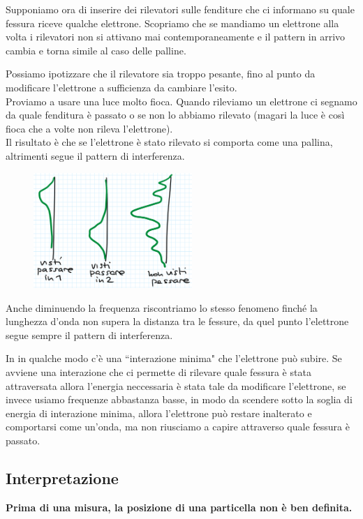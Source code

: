 \bigskip

\noindent
Supponiamo ora di inserire dei rilevatori sulle fenditure che ci informano su quale fessura riceve qualche elettrone.
Scopriamo che se mandiamo un elettrone alla volta i rilevatori non si attivano mai contemporaneamente e il pattern in arrivo cambia e torna simile al caso delle palline.\bigskip


Possiamo ipotizzare che il rilevatore sia troppo pesante, fino al punto da modificare l'elettrone a sufficienza da cambiare l'esito.\\
Proviamo a usare una luce molto fioca. Quando rileviamo un elettrone ci segnamo da quale fenditura \`e passato o se non lo abbiamo rilevato (magari la luce \`e cos\`i fioca che a volte non rileva l'elettrone).\\
Il risultato \`e che se l'elettrone \`e stato rilevato si comporta come una pallina, altrimenti segue il pattern di interferenza.
\begin{figure}[!htb]
    \centering
    \includegraphics[width=6cm]{images/visti_passare_o_non_visti.png}
\end{figure}


Anche diminuendo la frequenza riscontriamo lo stesso fenomeno finch\'e la lunghezza d'onda non supera la distanza tra le fessure, da quel punto l'elettrone segue sempre il pattern di interferenza.\bigskip


In in qualche modo c'\`e una ``interazione minima" che l'elettrone pu\`o subire. Se avviene una interazione che ci permette di rilevare quale fessura \`e stata attraversata allora l'energia neccessaria \`e stata tale da modificare l'elettrone, se invece usiamo frequenze abbastanza basse, in modo da scendere sotto la soglia di energia di interazione minima, allora l'elettrone pu\`o restare inalterato e comportarsi come un'onda, ma non riusciamo a capire attraverso quale fessura \`e passato.

\subsection{Interpretazione}
\begin{fact}
\textbf{Prima di una misura, la posizione di una particella non \`e ben definita.}
\end{fact}

